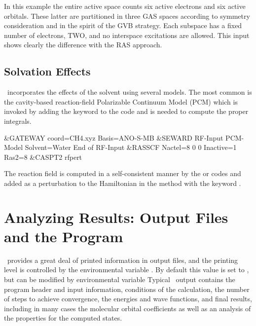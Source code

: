In this example the entire active space counts six active electrons
and six active orbitals. These latter are partitioned in three GAS spaces
according to symmetry consideration and in the spirit of the GVB strategy.
Each subspace has a fixed number of electrons, TWO, and no interspace
excitations are allowed. This input shows clearly the difference
with the RAS approach.

\subsection{Solvation Effects}

\molcas\ incorporates the effects of the solvent using several models.
The most common is the cavity-based reaction-field Polarizable Continuum Model (PCM)
which is invoked by adding the keyword  to the
 code and is needed to compute the proper integrals.

\begin{inputlisting}
&GATEWAY
  coord=CH4.xyz
  Basis=ANO-S-MB
&SEWARD
  RF-Input
   PCM-Model
   Solvent=Water
  End of RF-Input
&RASSCF
  Nactel=8 0 0
  Inactive=1
  Ras2=8
&CASPT2
  rfpert
\end{inputlisting}

The reaction field is computed in a self-consistent manner by the
 or  codes and added as a perturbation
to the Hamiltonian in the  method with the keyword .

\section{Analyzing Results: Output Files and the  Program}
\molcas\ provides a great deal of printed information in output files, and
the printing level is controlled by the environmental variable .
By default this value is set to , but can be modified by environmental variable 
Typical \molcas\ output contains the program
header and input information, conditions of the calculation, the number of steps to achieve convergence, the energies and wave functions, and
final results, including in many cases the molecular orbital
coefficients as well as an analysis of the properties for the computed states.


